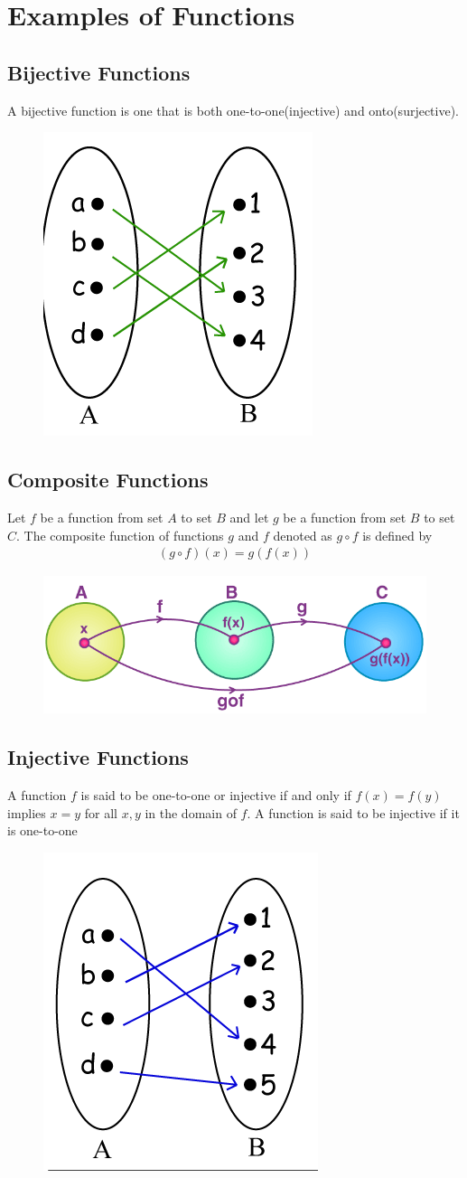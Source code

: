 \documentclass[12pt]{report}
\begin{document}
	\section{Examples of Functions}
	\subsection{Bijective Functions}
	A bijective function is one that is both one-to-one(injective) and onto(surjective).
	
	\begin{figure}[h!]
		\centering
		\includegraphics[width=0.3\linewidth]{bijective}
	\end{figure}
	
	\subsection{Composite Functions}
	Let $f$ be a function from set $A$ to set $B$ and let $g$ be a function from set $B$ to set $C$. The composite function of functions $g$ and $f$ denoted as $g \circ f$ is defined by
	\begin{eqnarray*}
		(g\circ f)(x) = g(f(x))
	\end{eqnarray*}
	\begin{figure}[h!]
		\centering
		\includegraphics[width=0.5\linewidth]{composite}
	\end{figure}
	
	\subsection{Injective Functions}
	A function $f$ is said to be one-to-one or injective if and only if $f(x) = f(y)$ implies $x=y$ for all $x,y$ in the domain of $f$. A function is said to be injective if it is one-to-one
	\begin{figure}[h!]
		\centering
		\includegraphics[width=0.3\linewidth]{injective}
	\end{figure}
	
\end{document}
